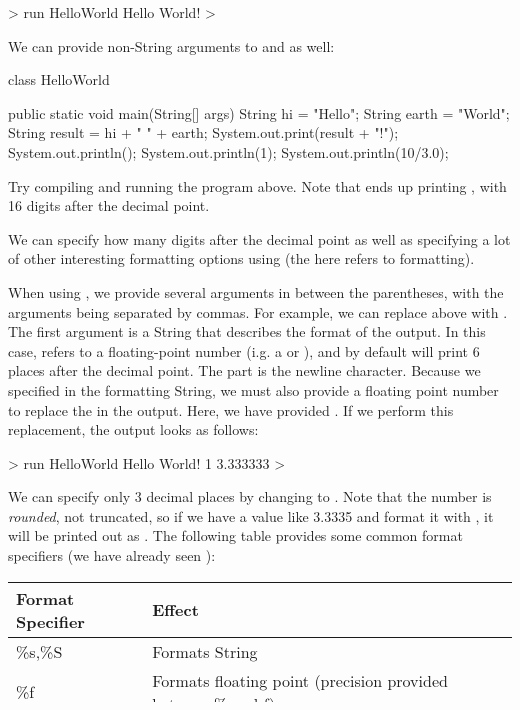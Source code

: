 \begin{code}
> run HelloWorld
Hello	      World!
>
\end{code}

We can provide non-String arguments to  and  as well:
\begin{code}
class HelloWorld {

    public static void main(String[] args) {
        String hi = "Hello";
        String earth = "World";
        String result = hi + " " + earth;
        System.out.print(result + "!");
        System.out.println();
        System.out.println(1);
        System.out.println(10/3.0);
    }

}
\end{code}
Try compiling and running the program above.
Note that  ends up printing
, with 16 digits after the decimal point.

We can specify how many digits after the decimal point as well
as specifying a lot of other interesting formatting options
using  (the  here refers to formatting).

When using , we provide several arguments
in between the parentheses, with the arguments being separated by
commas.
For example, we can replace  above
with .
The first argument  is a String that describes the format of the output.
In this case,  refers to a floating-point number (i.g. a  or ),
and by default will print 6 places after the decimal point.
The  part is the newline character.
Because we specified  in the formatting String, we must also provide
a floating point number to replace the  in the output. Here,
we have provided .
If we perform this replacement, the output looks as follows:
\begin{code}
> run HelloWorld
Hello World!
1
3.333333
> 
\end{code}

We can specify only 3 decimal places by changing  to .
Note that the number is \emph{rounded}, not truncated, so if we have a value like
3.3335 and format it with , it will be printed out as .
The following table provides some common format specifiers (we have already seen
):

\begin{tabular}{|l|l|}
\hline
Format Specifier & Effect\\
\hline
\%s,\%S & Formats String\\
\%f & Formats floating point (precision provided between \% and f)\\
\%d & Formats integer\\
\%c & Formats character\\
\%b, \%B & Formats Boolean\\
\hline
\end{tabular}

